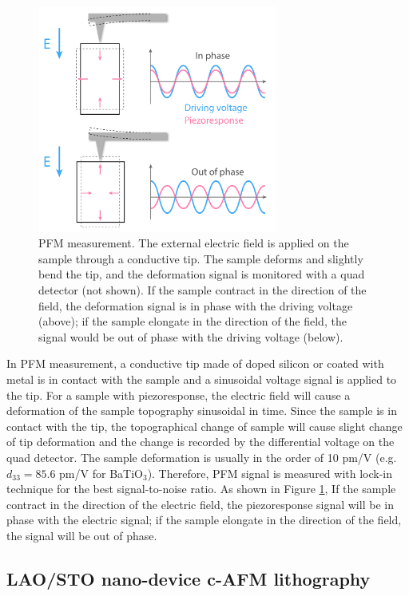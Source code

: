 \documentclass[pdflatex, sectionletters, 12pt]{pittetd}    %
\begin{document}
\begin{figure}[p]
	\centering
	\includegraphics[width=0.7\textwidth]{Drawing/PFM.pdf}
	\caption{PFM measurement. The external electric field is applied on the sample through a conductive tip. The sample deforms and slightly bend the tip, and the deformation signal is monitored with a quad detector (not shown). If the sample contract in the direction of the field, the deformation signal is in phase with the driving voltage (above); if the sample elongate in the direction of the field, the signal would be out of phase with the driving voltage (below).}
	\label{FIG:PFM}
\end{figure}

In PFM measurement, a conductive tip made of doped silicon or coated with metal is in contact with the sample and a sinusoidal voltage signal is applied to the tip. For a sample with piezoresponse, the electric field will cause a deformation of the sample topography sinusoidal in time. Since the sample is in contact with the tip, the topographical change of sample will cause slight change of tip deformation and the change is recorded by the differential voltage on the quad detector. The sample deformation is usually in the order of 10 pm/V (e.g. $d_{33} = 85.6$ pm/V for BaTiO$_3$\cite{berlincourt1958elastic}). Therefore, PFM signal is measured with lock-in technique for the best signal-to-noise ratio. As shown in Figure \ref{FIG:PFM}, If the sample contract in the direction of the electric field, the piezoresponse signal will be in phase with the electric signal; if the sample elongate in the direction of the field, the signal will be out of phase.

\subsection{LAO/STO nano-device c-AFM lithography}
\label{SEC:AFMLitho}
\end{document}
